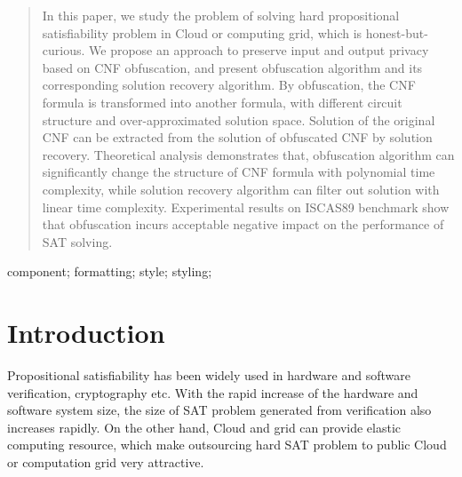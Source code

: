 \documentclass[conference,compsocconf]{IEEEtran}
\begin{document}
\begin{abstract}
In this paper, we study the problem of solving hard propositional satisfiability problem in Cloud or computing grid,
which is honest-but-curious.
We propose an approach to preserve input and output privacy based on CNF obfuscation,
and present obfuscation algorithm and its corresponding solution recovery algorithm.
By obfuscation, the CNF formula is transformed into another formula,
with different circuit structure and over-approximated solution space.
Solution of the original CNF can be extracted from the solution of obfuscated CNF by solution recovery.
Theoretical analysis demonstrates that,
obfuscation algorithm can significantly change the structure of CNF formula with polynomial time complexity,
while solution recovery algorithm can filter out solution with linear time complexity.
Experimental results on ISCAS89 benchmark show that obfuscation incurs acceptable negative impact on the performance of SAT solving.
\end{abstract}

\begin{IEEEkeywords}
component; formatting; style; styling;

\end{IEEEkeywords}


%
\IEEEpeerreviewmaketitle



\section{Introduction}
Propositional satisfiability\cite{SATtheory} has been widely used in hardware and software verification\cite{HardwareSAT,softwareSAT},
cryptography\cite{cryptoSAT} etc.
With the rapid increase of the hardware and software system size,
the size of SAT problem generated from verification  also increases rapidly.
On the other hand, Cloud and grid can provide elastic computing resource,
which make outsourcing hard SAT problem to public Cloud or computation grid\cite{Nordugrid,CloudSMT,OneSpin} very attractive.
\end{document}
